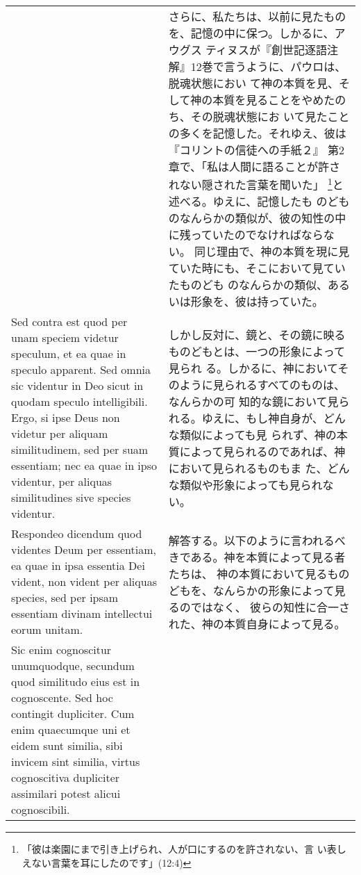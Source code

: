 \documentclass[10pt]{jsarticle} %
\begin{document}
\begin{longtable}{p{21em}p{21em}}
&

さらに、私たちは、以前に見たものを、記憶の中に保つ。しかるに、アウグス
ティヌスが『創世記逐語注解』12巻で言うように、パウロは、脱魂状態におい
て神の本質を見、そして神の本質を見ることをやめたのち、その脱魂状態にお
いて見たことの多くを記憶した。それゆえ、彼は『コリントの信徒への手紙２』
第2章で、「私は人間に語ることが許されない隠された言葉を聞いた」
\footnote{「彼は楽園にまで引き上げられ、人が口にするのを許されない、言
い表しえない言葉を耳にしたのです」(12:4)}と述べる。ゆえに、記憶したも
のどものなんらかの類似が、彼の知性の中に残っていたのでなければならない。
同じ理由で、神の本質を現に見ていた時にも、そこにおいて見ていたものども
のなんらかの類似、あるいは形象を、彼は持っていた。
\\

{\sc  Sed contra est} quod per unam speciem videtur speculum, et
 ea quae in speculo apparent. Sed omnia sic videntur in Deo sicut in
 quodam speculo intelligibili. Ergo, si ipse Deus non videtur per
 aliquam similitudinem, sed per suam essentiam; nec ea quae in ipso
 videntur, per aliquas similitudines sive species videntur.

&

しかし反対に、鏡と、その鏡に映るものどもとは、一つの形象によって見られ
る。しかるに、神においてそのように見られるすべてのものは、なんらかの可
知的な鏡において見られる。ゆえに、もし神自身が、どんな類似によっても見
られず、神の本質によって見られるのであれば、神において見られるものもま
た、どんな類似や形象によっても見られない。

\\

{\sc Respondeo dicendum} quod videntes Deum per essentiam, ea quae in
ipsa essentia Dei vident, non vident per aliquas species, sed per
ipsam essentiam divinam intellectui eorum unitam.

&

解答する。以下のように言われるべきである。神を本質によって見る者たちは、
神の本質において見るものどもを、なんらかの形象によって見るのではなく、
彼らの知性に合一された、神の本質自身によって見る。

\\

Sic enim cognoscitur unumquodque, secundum quod similitudo eius est in
cognoscente. Sed hoc contingit dupliciter. Cum enim quaecumque uni et
eidem sunt similia, sibi invicem sint similia, virtus cognoscitiva
dupliciter assimilari potest alicui cognoscibili. 

&


\end{longtable}
\end{document}
